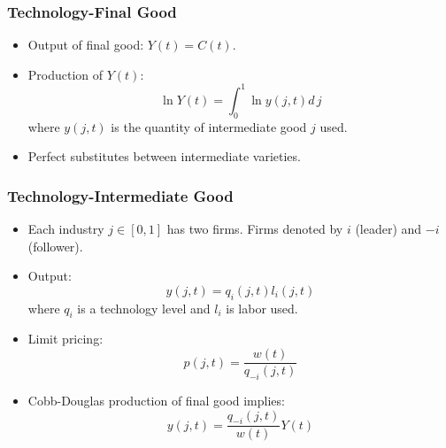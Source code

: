 \documentclass{beamer}
\begin{document}
\begin{frame}[t]\frametitle{Technology-Final Good} 
  \begin{itemize}
	  \vspace{2mm}
    \item<+-> Output of final good: $Y(t) = C(t)$.
    
	\vspace{2mm}
    \item<+-> Production of $Y(t)$:
      \begin{equation*} \label{eq:tech_output}
        \ln Y(t) = \int_{0}^{1} \ln y(j, t) d\,j 
      \end{equation*}
      where $y(j, t)$ is the quantity of intermediate good $j$ used.
	\vspace{2mm}
    \item<+-> Perfect substitutes between intermediate varieties.
    
  \end{itemize}
\end{frame}

\begin{frame}[t]\frametitle{Technology-Intermediate Good} 
  \begin{itemize}
	  \vspace{2mm}
    \item<+-> Each industry $j \in [0, 1]$ has two firms. Firms denoted by $i$ (leader) and $-i$ (follower).

    \item<+-> Output:
      \begin{equation*} \label{eq:intermediate_production}
        y(j, t) = q_i(j, t)l_i(j, t)
      \end{equation*}
      where $q_i$ is a technology level and $l_i$ is labor used. 

    \item<+-> Limit pricing:
      \begin{equation*} \label{eq:limit_pricing}
        p(j, t) = \frac{w(t)}{q_{-i}(j, t)}      
      \end{equation*}

    \item<+-> Cobb-Douglas production of final good implies:
      \begin{equation*}
        y(j, t) = \frac{q_{-i}(j, t)}{w(t)}Y(t)
      \end{equation*}
  \end{itemize}
\end{frame}
\end{document}
